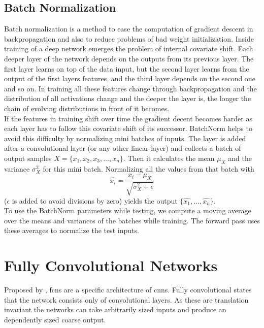 \subsection{Batch Normalization} %
\label{sub:conepts:nn:batchnorm}
Batch normalization \citep{ioffe_batch_2015} is a method to ease the computation of gradient descent in backpropagation and also to reduce problems of bad weight initialization. Inside training of a deep network emerges the problem of internal covariate shift. Each deeper layer of the network depends on the outputs from its previous layer. The first layer learns on top of the data input, but the second layer learns from the output of the first layers features, and the third layer depends on the second one and so on. In training all these features change through backpropagation and the distribution of all activations change and the deeper the layer is, the longer the chain of evolving distributions in front of it becomes.\\
If the features in training shift over time the gradient decent becomes harder as each layer has to follow this covariate shift of its successor. BatchNorm helps to avoid this difficulty by normalizing mini batches of inputs. The layer is added after a convolutional layer (or any other linear layer) and collects a batch of output samples $X = \{x_1, x_2, x_3, \dots, x_n\}$. Then it calculates the mean $\mu_X$ and the variance $\sigma_X^2$ for this mini batch. Normalizing all the values from that batch with
\begin{equation}
    \hat{x_i} = \frac{x_i - \mu_X}{\sqrt{\sigma_X^2 + \epsilon}}
\end{equation}
($\epsilon$ is added to avoid divisions by zero) yields the output $\{\hat{x_1},\dots,\hat{x_n}\}$.\\
To use the BatchNorm parameters while testing, we compute a moving average over the means and variances of the batches while training. The forward pass uses these averages to normalize the test inputs.

\clearpage
\section{Fully Convolutional Networks}
\label{sec:concepts:fcn}
Proposed by \citet{long_fully_2015}, \glspl{fcn} are a specific architecture of \glspl{cnn}. Fully convolutional states that the network consists only of convolutional layers. As these are translation invariant the networks can take arbitrarily sized inputs and produce an dependently sized coarse output.


